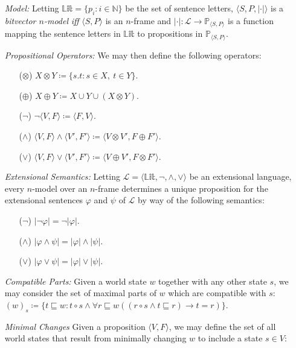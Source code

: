 \documentclass[a4paper, 11pt]{article} %
\newcommand{\tuple}[1]{\langle#1\rangle} %
\newcommand{\set}[1]{\lbrace#1\rbrace} %
\renewcommand{\P}[0]{\mathbb{P}}
\newcommand{\Lit}[0]{\mathbb{Lit}}
\renewcommand{\L}[0]{\mathcal{L}}
\newcommand{\N}[0]{\mathbb{N}}
\renewcommand{\vert}[1]{\lvert#1\rvert}
\begin{document}
\begin{enumerate}
  \item[\it Model:] Letting $\Lit=\set{p_i:i\in\N}$ be the set of sentence letters, $\tuple{S,P,\vert{\cdot}}$ is a \textit{bitvector $n$-model} \textit{iff} $\tuple{S,P}$ is an $n$-frame and $\vert{\cdot}:\L\to\P_{\tuple{S,P}}$ is a function mapping the sentence letters in $\Lit$ to propositions in $\P_{\tuple{S,P}}$.
  \item[\it Propositional Operators:] We may then define the following operators:
    \begin{itemize}
      \item[($\otimes$)] $X \otimes Y \coloneq \set{s.t : s \in X,\ t \in Y}$.
      \item[($\oplus$)] $X \oplus Y \coloneq X \cup Y \cup (X \otimes Y)$.
      \item[($\neg$)] $\neg\tuple{V,F} \coloneq \tuple{F,V}$.
      \item[($\wedge$)] $\tuple{V,F}\wedge\tuple{V',F'} \coloneq \tuple{V\otimes V',F\oplus F'}$.
      \item[($\vee$)] $\tuple{V,F}\vee\tuple{V',F'} \coloneq \tuple{V\oplus V',F\otimes F'}$.
    \end{itemize}
  \item[\it Extensional Semantics:] Letting $\L=\tuple{\Lit,\neg,\wedge,\vee}$ be an extensional language, every $n$-model over an $n$-frame determines a unique proposition for the extensional sentences $\varphi$ and $\psi$ of $\L$ by way of the following semantics: 
    \begin{itemize}
      \item[($\neg$)] $\vert{\neg\varphi}=\neg\vert{\varphi}$.
      \item[($\wedge$)] $\vert{\varphi\wedge\psi}=\vert{\varphi}\wedge\vert{\psi}$.
      \item[($\vee$)] $\vert{\varphi\vee\psi}=\vert{\varphi}\vee\vert{\psi}$.
    \end{itemize}
  \item[\it Compatible Parts:] Given a world state $w$ together with any other state $s$, we may consider the set of maximal parts of $w$ which are compatible with $s$:\\ 
    $(w)_s\coloneq \set{t\sqsubseteq w:t\circ s \wedge \forall r\sqsubseteq w((r\circ s \wedge t \sqsubseteq r) \rightarrow t = r)}$.
  \item[\it Minimal Changes] Given a proposition $\tuple{V,F}$, we may define the set of all world states that result from minimally changing $w$ to include a state $s\in V$:\\ 

\end{enumerate}
\end{document}
